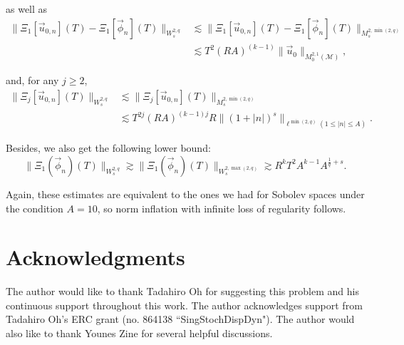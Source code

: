 \documentclass[letterpaper, 11pt,  reqno]{amsart}
\newcommand{\1}{\hspace{0.5mm}\text{I}\hspace{0.5mm}}
\newcommand{\noi}{\noindent}
\newcommand{\M}{\mathcal{M}}
\newcommand{\les}{\lesssim}
\newcommand{\ges}{\gtrsim}
\numberwithin{equation}{section}
\numberwithin{theorem}{section}
\newcommand{\abs}[1]{\lvert#1\rvert}
\begin{document}
\noi as well as
\begin{align}
\label{EQ:EstForWs2q_Xi1Upper}
\| \Xi_1 [\vec{u}_{0,n}] (T) - \Xi_1 [\vec {\phi}_n](T) \|_{W_s^{2,q}}  & \les \| \Xi_1 [\vec{u}_{0,n}] (T) - \Xi_1 [\vec {\phi}_n](T) \|_{M_s^{2,\min(2,q)}}\\
	& \les T^{2} (RA)^{(k-1)} \| \vec{u}_0 \|_{M^{2,1}_0( \M)},
\end{align}

\noi and, for any $j \geq 2$, 
\begin{align}
\label{EQ:EstForWs2q_Xij}
\| \Xi_j [\vec{u}_{0,n}] (T) \|_{W_s^{2,q}}  & \les \| \Xi_j [\vec{u}_{0,n}] (T) \|_{M_s^{2,\min(2,q)}}\\
	& \les T^{2j} (RA)^{(k-1)j} R \| (1 + \abs{n})^s \|_{\ell^{\min(2,q)} ( 1 \leq \abs{n} \leq A)}.
\end{align}

\noi Besides, we also get the following lower bound:
\begin{equation}
\label{EQ:EstForWs2q_Xi1}
\| \Xi_1 (\vec{\phi}_n) (T) \|_{W_s^{2,q}} \ges \| \Xi_1 (\vec{\phi}_n) (T) \|_{W_s^{2,\max(2,q)}} \ges R^k T^2 A^{k - 1}A^{ \frac 1q + s}.
\end{equation}

\noi Again, these estimates are equivalent to the ones we had for Sobolev spaces under the condition $A = 10$, so norm inflation with infinite loss of regularity follows.



\section*{Acknowledgments} The author would like to thank Tadahiro Oh for suggesting this problem and his continuous support throughout this work. The author acknowledges support from Tadahiro Oh's ERC grant (no. 864138 ``SingStochDispDyn"). The author would also like to thank Younes Zine for several helpful discussions.
\end{document}
